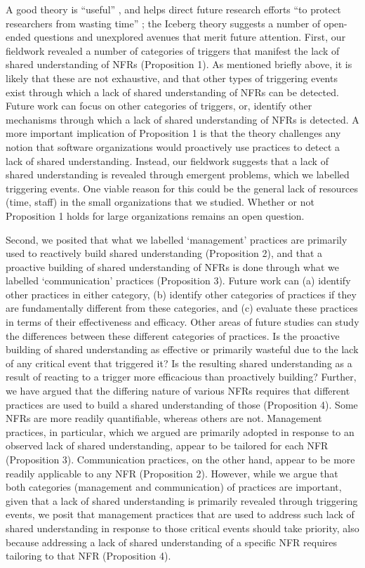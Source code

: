 \documentclass[smallextended]{svjour3}       %
\begin{document}
A good theory  is ``useful'' \citep{mintzberg2017developing}, and helps direct future research efforts ``to protect researchers from wasting time'' \cite[p. 8]{miner1980}; the Iceberg theory suggests a number of open-ended questions and unexplored avenues that merit future attention.
First, our fieldwork revealed a number of categories of triggers that manifest the lack of shared understanding of NFRs (Proposition 1). As mentioned briefly above, it is likely that these are not exhaustive, and that other types of triggering events exist through which a lack of shared understanding of NFRs can be detected. 
Future work can focus on other categories of triggers, or, identify other mechanisms through which a lack of shared understanding of NFRs is detected.
A more important implication of Proposition 1 is that the theory challenges any notion that software organizations would proactively use practices to detect a lack of shared understanding. Instead, our fieldwork suggests that a lack of shared understanding is revealed through emergent problems, which we labelled triggering events. One viable reason for this could be the general lack of resources (time, staff) in the small organizations that we studied. Whether or not Proposition 1 holds for large organizations remains an open question.


Second, we posited that what we labelled `management' practices are primarily used to reactively build shared understanding (Proposition 2), and that a proactive building of shared understanding of NFRs is done through what we labelled `communication' practices (Proposition 3). Future work can (a) identify other practices in either category, (b) identify other categories of practices if they are fundamentally different from these categories, and (c) evaluate these practices in terms of their effectiveness and efficacy. 
Other areas of future studies can study the differences between these different categories of practices.
Is the proactive building of shared understanding as effective or primarily wasteful due to the lack of any critical event that triggered it? 
Is the resulting shared understanding as a result of reacting to a trigger more efficacious than proactively building?
Further, we have argued that the differing nature of various NFRs requires that different practices are used to build a shared understanding of those (Proposition 4). Some NFRs are more readily quantifiable, whereas others are not. Management practices, in particular, which we argued are primarily adopted in response to an observed lack of shared understanding, appear to be tailored for each NFR (Proposition 3). Communication practices, on the other hand, appear to be more readily applicable to any NFR (Proposition 2). However, while we argue that both categories (management and communication) of practices are important, given that a lack of shared understanding is primarily revealed through triggering events, we posit that management practices that are used to address such lack of shared understanding in response to those critical events should take priority, also because addressing a lack of shared understanding of a specific NFR requires tailoring to that NFR (Proposition 4).
\end{document}
